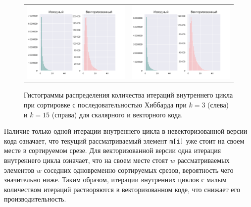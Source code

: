 \begin{figure}[h!]
\centering
\begin{tabular}{ll}
\includegraphics[scale=0.5]{./pics/text_4_vec_irreg/hibbard_k_3.pdf}
&
\includegraphics[scale=0.5]{./pics/text_4_vec_irreg/hibbard_k_15.pdf}
\end{tabular}
\singlespacing
{}\caption{Гистограммы распределения количества итераций внутреннего цикла при сортировке с последовательностью
Хиббарда при $k = 3$ (слева) и $k = 15$ (справа) для скалярного и векторного кода.}
\label{fig:text_4_vec_irreg_hibbard_hist}
\end{figure}

Наличие только одной итерации внутреннего цикла в невекторизованной версии кода означает, что текущий рассматриваемый элемент \texttt{m[i]} уже стоит на своем месте в сортируемом срезе.
Для векторизованной версии одна итерация внутреннего цикла означает, что на своем месте стоят $w$ рассматриваемых элементов $w$ соседних одновременно сортируемых срезов, вероятность чего значительно ниже.
Таким образом, итерации внутренних циклов с малым количеством итераций растворяются в векторизованном коде, что снижает его производительность.

